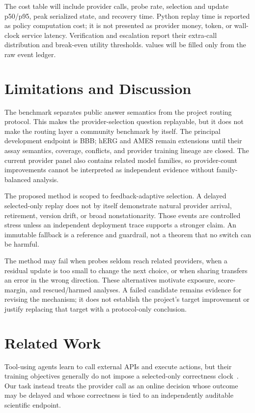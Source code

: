 \documentclass[sigconf,anonymous]{aamas}
\newcommand{\tbd}{\text{TBD}}
\begin{document}
The cost table will include provider calls, probe rate, selection and update p50/p95, peak serialized state, and recovery time. Python replay time is reported as policy computation cost; it is not presented as provider money, token, or wall-clock service latency. Verification and escalation report their extra-call distribution and break-even utility thresholds. \tbd{} values will be filled only from the raw event ledger.

\section{Limitations and Discussion}
The benchmark separates public answer semantics from the project routing protocol. This makes the provider-selection question replayable, but it does not make the routing layer a community benchmark by itself. The principal development endpoint is BBB; hERG and AMES remain extensions until their assay semantics, coverage, conflicts, and provider training lineage are closed. The current provider panel also contains related model families, so provider-count improvements cannot be interpreted as independent evidence without family-balanced analysis.

The proposed method is scoped to feedback-adaptive selection. A delayed selected-only replay does not by itself demonstrate natural provider arrival, retirement, version drift, or broad nonstationarity. Those events are controlled stress unless an independent deployment trace supports a stronger claim. An immutable fallback is a reference and guardrail, not a theorem that no switch can be harmful.

The method may fail when probes seldom reach related providers, when a residual update is too small to change the next choice, or when sharing transfers an error in the wrong direction. These alternatives motivate exposure, score-margin, and rescued/harmed analyses. A failed candidate remains evidence for revising the mechanism; it does not establish the project's target improvement or justify replacing that target with a protocol-only conclusion.

\section{Related Work}
Tool-using agents learn to call external APIs and execute actions, but their training objectives generally do not impose a selected-only correctness clock~\cite{schick2023toolformer,yao2023react}. Our task instead treats the provider call as an online decision whose outcome may be delayed and whose correctness is tied to an independently auditable scientific endpoint.
\end{document}
